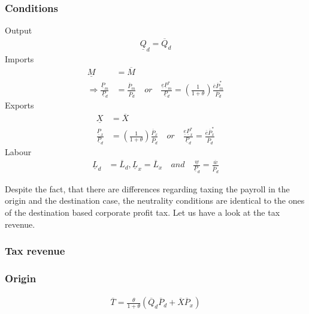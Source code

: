 \subsubsection*{Conditions}

Output
\begin{equation}
\begin{aligned}
\underline Q_d = \overline Q_d
\end{aligned}
\end{equation}
\newline
\noindent Imports
\begin{equation}
\begin{aligned}
\underline M &= \overline M \\
\Rightarrow \frac{\underline P_m}{\underline P_d} &= \frac{\overline P_m}{\overline P_d} \quad or \quad \frac{\underline e \underline P_m^*}{\underline P_d} =  \left( \frac{1}{1+\theta} \right) \frac{\overline e \overline P^*_m}{\overline P_d}
\end{aligned}
\end{equation}
\noindent Exports
\begin{equation}
\begin{aligned}
\underline X &= \overline X \\ \frac{\underline P_x}{\underline P_d} &=  \left( \frac{1}{1+\theta} \right) \frac{\overline P_x}{\overline P_d} \quad or \quad \frac{\underline e \underline P_x^*}{\underline P_d} = \frac{\overline e \overline P^*_x}{\overline P_d}
\end{aligned}
\end{equation}
\noindent Labour
\begin{equation}
\begin{aligned}
\underline L_d &= \overline L_d, \underline L_x = \overline L_x \quad and \quad \frac{\underline w}{\underline P_d} = \frac{\overline w}{\overline P_d}
\end{aligned}
\end{equation}

Despite the fact, that there are differences regarding taxing the payroll in the origin and the destination case, the neutrality conditions are identical to the ones of the destination based corporate profit tax. Let us have a look at the tax revenue. 

\subsubsection{Tax revenue}
\subsubsection*{Origin} 
\begin{equation} 
\begin{aligned}
\overline T = \frac{\theta}{1+\theta} \left( \overline Q_d \overline P_d + \overline X \overline P_x \right) 
\end{aligned} 
\end{equation}

